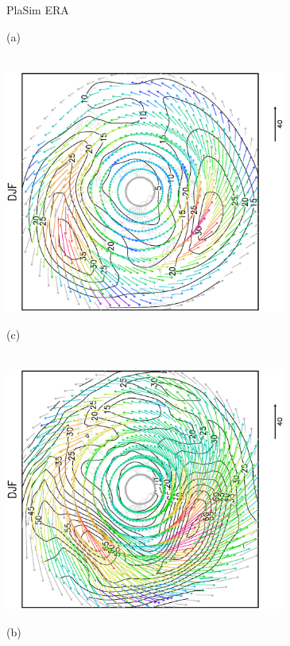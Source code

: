 \documentclass[12pt,a4paper,twoside,openright,headinclude,liststotoc,bibtotoc]{scrreprt}
\begin{document}
\begin{figure}[c]
\hspace{3.8cm}PlaSim \vspace{0.2cm} \hspace{7.3cm} ERA \\
\parbox{8.5cm}{\hspace{0.95cm}\begin{scriptsize}(a)\end{scriptsize} \vspace{-0.5cm} \\
\includegraphics[height=8.0cm,angle=-90]
{eps/north_DJF_PFLX_TMEAN1.eps}
}
\parbox{8.5cm}{\hspace{0.95cm}\begin{scriptsize}(c)\end{scriptsize} \vspace{-0.5cm} \\
\includegraphics[height=8.0cm,angle=-90]
{eps/dailyERA_north_DJF_PFLX_TMEAN.eps}
}
\parbox{8.5cm}{\hspace{0.95cm}\begin{scriptsize}(b)\end{scriptsize} \vspace{-0.5cm} \\
}
\end{figure}
\end{document}
